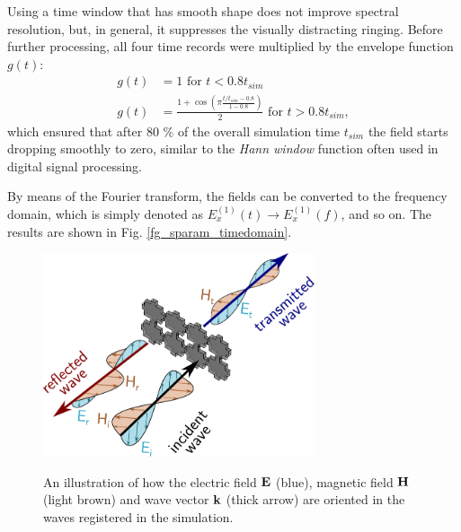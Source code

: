 Using a time window that has smooth shape does not improve spectral resolution, but, in general, it suppresses the visually distracting ringing. Before further processing, all four time records were multiplied by the envelope function $g(t)$:
\begin{equation} 
\begin{split}
	g(t) 	& = 1 \text{ for } t < 0.8 t_{sim} \\
	g(t)    & = \frac{1 + \cos\left(\pi \frac{t/t_{sim}-0.8}{1-0.8}\right)}{2}  \text{ for } t > 0.8 t_{sim},
\end{split}
\label{eq_envelope}\end{equation}
which ensured that after 80 \% of the overall simulation time $t_{sim}$ the field starts dropping smoothly to zero, similar to the \textit{Hann window} function often used in digital signal processing. %

By means of the Fourier transform, the fields can be converted to the frequency domain, which is simply denoted as $E_{x}^{(1)}(t) \rightarrow E_{x}^{(1)}(f)$, and so on. The results are shown in Fig. \ref{fg_sparam_timedomain}. 
\begin{figure}[ht] \caption{An illustration of how the electric field $\mathbf{E}$ (blue), magnetic field $\mathbf{H}$ (light brown) and wave vector ${\mathbf{k}}$ (thick arrow) are oriented in the waves registered in the simulation.}  \centering \includegraphics[width=8cm]{img/sim_separating_wave.pdf} \label{fg_separating_wave}\end{figure}

